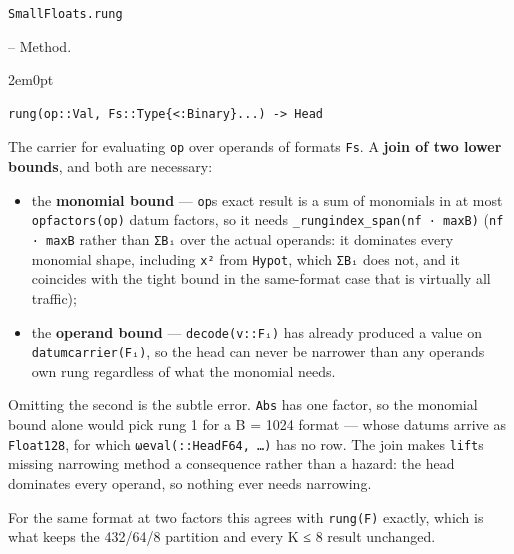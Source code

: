 \par\medskip\noindent\begin{minipage}{\linewidth}
\hypertarget{7234603244356363868}{\texttt{SmallFloats.rung}}  -- {Method.}
\nopagebreak
\begin{adjustwidth}{2em}{0pt}


\begin{verbatim}
rung(op::Val, Fs::Type{<:Binary}...) -> Head
\end{verbatim}

The carrier for evaluating \texttt{op} over operands of formats \texttt{Fs}. A \textbf{join of two lower bounds}, and both are necessary:

\begin{itemize}
\item the \textbf{monomial bound} — \texttt{op}{\textquotesingle}s exact result is a sum of monomials in at most \texttt{opfactors(op)} datum factors, so it needs \texttt{\_\allowbreak{}rungindex\_\allowbreak{}span(\allowbreak{}nf · maxB)} (\texttt{nf · maxB} rather than \texttt{ΣBᵢ} over the actual operands: it dominates every monomial shape, including \texttt{x²} from \texttt{Hypot}, which \texttt{ΣBᵢ} does not, and it coincides with the tight bound in the same-format case that is virtually all traffic);


\item the \textbf{operand bound} — \texttt{decode(v::Fᵢ)} has already produced a value on \texttt{datumcarrier(Fᵢ)}, so the head can never be narrower than any operand{\textquotesingle}s own rung regardless of what the monomial needs.

\end{itemize}
Omitting the second is the subtle error. \texttt{Abs} has one factor, so the monomial bound alone would pick rung 1 for a B = 1024 format — whose datums arrive as \texttt{Float128}, for which \texttt{ωeval(::HeadF64, …)} has no row. The join makes \texttt{lift}{\textquotesingle}s missing narrowing method a consequence rather than a hazard: the head dominates every operand, so nothing ever needs narrowing.

For the same format at two factors this agrees with \texttt{rung(F)} exactly, which is what keeps the 432/64/8 partition and every K ≤ 8 result unchanged.



\end{adjustwidth}
\end{minipage}
\par\medskip

